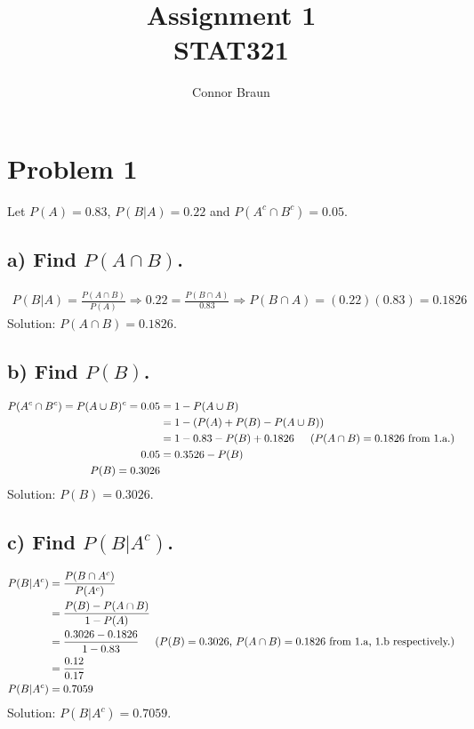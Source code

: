 \documentclass[11pt, letterpaper]{article}
\begin{document}
\title{Assignment 1\\\normalsize STAT321}
\author{Connor Braun}

\allowdisplaybreaks

\maketitle

\section*{Problem 1}
Let $P(A)=0.83$, $P(B|A)=0.22$ and $P(A^c\cap B^c)=0.05$.

\subsection*{a) \normalfont Find $P(A\cap B)$.}
\begin{align*}
    P(B|A)=\frac{P(A\cap B)}{P(A)}\Rightarrow 0.22 = \frac{P(B\cap A)}{0.83} \Rightarrow P(B\cap A)=(0.22)(0.83)=0.1826
\end{align*}
Solution: $P(A\cap B)=0.1826$. 

\subsection*{b) \normalfont Find $P(B)$.}
\begin{align*}
    P(A^c\cap B^c)=P(A\cup B)^c=0.05&=1-P(A\cup B)\\
    &=1-(P(A)+P(B)-P(A\cup B))\\
    &=1-0.83-P(B)+0.1826 \text{\indent ($P(A\cap B)=0.1826$ from 1.a.)}\\ 
    0.05&=0.3526-P(B)\\
    P(B)=0.3026
\end{align*}
Solution: $P(B)=0.3026$.

\subsection*{c) \normalfont Find $P(B|A^c)$.}
\begin{align*}
    P(B|A^c)&=\frac{P(B\cap A^c)}{P(A^c)}\\
    &=\frac{P(B)-P(A\cap B)}{1-P(A)}\\
    &=\frac{0.3026-0.1826}{1-0.83} \text{\indent ($P(B)=0.3026$, $P(A\cap B)=0.1826$ from 1.a, 1.b respectively.)}\\
    &=\frac{0.12}{0.17}\\
    P(B|A^c)&=0.7059
\end{align*}
Solution: $P(B|A^c)=0.7059$.
\end{document}
